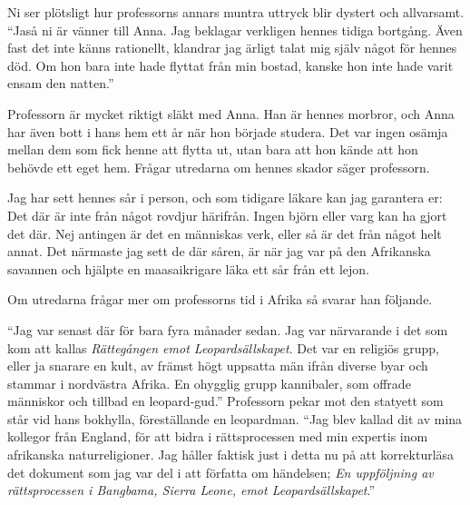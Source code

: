 \begin{displayquote}
	Ni ser plötsligt hur professorns annars muntra uttryck blir dystert och allvarsamt.
	``Jaså ni är vänner till Anna. Jag beklagar verkligen hennes tidiga bortgång. Även fast det inte känns rationellt, klandrar jag ärligt talat mig själv något för hennes död. Om hon bara inte hade flyttat från min bostad, kanske hon inte hade varit ensam den natten.'' 
\end{displayquote}
%
Professorn är mycket riktigt släkt med Anna. Han är hennes morbror, och Anna har även bott i hans hem ett år när hon började studera. Det var ingen osämja mellan dem som fick henne att flytta ut, utan bara att hon kände att hon behövde ett eget hem. Frågar utredarna om hennes skador säger professorn.

\begin{displayquote}
	Jag har sett hennes sår i person, och som tidigare läkare kan jag garantera er: Det där är inte från något rovdjur härifrån. Ingen björn eller varg kan ha gjort det där. Nej antingen är det en människas verk, eller så är det från något helt annat. Det närmaste jag sett de där såren, är när jag var på den Afrikanska savannen och hjälpte en maasaikrigare läka ett sår från ett lejon.
\end{displayquote}
%
Om utredarna frågar mer om professorns tid i Afrika så svarar han följande.

\begin{displayquote}
	``Jag var senast där för bara fyra månader sedan. Jag var närvarande i det som kom att kallas \textit{Rättegången emot Leopardsällskapet}. Det var en religiös grupp, eller ja snarare en kult, av främst högt uppsatta män ifrån diverse byar och stammar i nordvästra Afrika. En ohygglig grupp kannibaler, som offrade människor och tillbad en leopard-gud.'' Professorn pekar mot den statyett som står vid hans bokhylla, föreställande en leopardman. ``Jag blev kallad dit av mina kollegor från England, för att bidra i rättsprocessen med min expertis inom afrikanska naturreligioner. Jag håller faktisk just i detta nu på att korrekturläsa det dokument som jag var del i att författa om händelsen; \textit{En uppföljning av rättsprocessen i Bangbama, Sierra Leone, emot Leopardsällskapet}.''
\end{displayquote}


